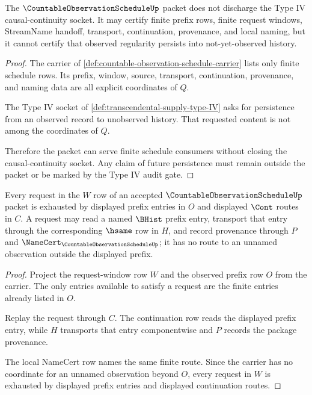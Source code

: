 \begin{theorem}
\label{thm:countable-observation-schedule-nonescape}
The $\CountableObservationScheduleUp$ packet does not discharge the Type IV causal-continuity socket. It may certify finite prefix rows, finite request windows, StreamName handoff, transport, continuation, provenance, and local naming, but it cannot certify that observed regularity persists into not-yet-observed history.
\end{theorem}
\begin{proof}
The carrier of \autoref{def:countable-observation-schedule-carrier} lists only finite schedule rows. Its prefix, window, source, transport, continuation, provenance, and naming data are all explicit coordinates of $Q$.

The Type IV socket of \autoref{def:transcendental-supply-type-IV} asks for persistence from an observed record to unobserved history. That requested content is not among the coordinates of $Q$.

Therefore the packet can serve finite schedule consumers without closing the causal-continuity socket. Any claim of future persistence must remain outside the packet or be marked by the Type IV audit gate.
\end{proof}

\begin{theorem}
\label{thm:countable-observation-schedule-finite-request-exhaustion}
Every request in the $W$ row of an accepted $\CountableObservationScheduleUp$ packet is exhausted by displayed prefix entries in $O$ and displayed $\Cont$ routes in $C$. A request may read a named $\BHist$ prefix entry, transport that entry through the corresponding $\hsame$ row in $H$, and record provenance through $P$ and $\NameCert_{\CountableObservationScheduleUp}$; it has no route to an unnamed observation outside the displayed prefix.
\end{theorem}
\begin{proof}
Project the request-window row $W$ and the observed prefix row $O$ from the carrier. The only entries available to satisfy a request are the finite entries already listed in $O$.

Replay the request through $C$. The continuation row reads the displayed prefix entry, while $H$ transports that entry componentwise and $P$ records the package provenance.

The local NameCert row names the same finite route. Since the carrier has no coordinate for an unnamed observation beyond $O$, every request in $W$ is exhausted by displayed prefix entries and displayed continuation routes.
\end{proof}


